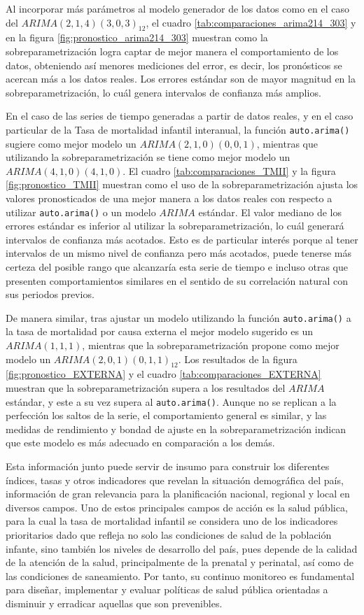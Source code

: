 \documentclass[
]{article}
\begin{document}
Al incorporar más parámetros al modelo generador de los datos como en el
caso del \(ARIMA(2,1,4)(3,0,3)_{12}\), el cuadro
\ref{tab:comparaciones_arima214_303} y en la figura
\ref{fig:pronostico_arima214_303} muestran como la sobreparametrización
logra captar de mejor manera el comportamiento de los datos, obteniendo
así menores mediciones del error, es decir, los pronósticos se acercan
más a los datos reales. Los errores estándar son de mayor magnitud en la
sobreparametrización, lo cuál genera intervalos de confianza más
amplios.

En el caso de las series de tiempo generadas a partir de datos reales, y
en el caso particular de la Tasa de mortalidad infantil interanual, la
función \texttt{auto.arima()} sugiere como mejor modelo un
\(ARIMA(2,1,0)(0,0,1)\), mientras que utilizando la sobreparametrización
se tiene como mejor modelo un \(ARIMA(4,1,0)(4,1,0)\). El cuadro
\ref{tab:comparaciones_TMII} y la figura \ref{fig:pronostico_TMII}
muestran como el uso de la sobreparametrización ajusta los valores
pronosticados de una mejor manera a los datos reales con respecto a
utilizar \texttt{auto.arima()} o un modelo \(ARIMA\) estándar. El valor
mediano de los errores estándar es inferior al utilizar la
sobreparametrización, lo cuál generará intervalos de confianza más
acotados. Esto es de particular interés porque al tener intervalos de un
mismo nivel de confianza pero más acotados, puede tenerse más certeza
del posible rango que alcanzaría esta serie de tiempo e incluso otras
que presenten comportamientos similares en el sentido de su correlación
natural con sus periodos previos.

De manera similar, tras ajustar un modelo utilizando la función
\texttt{auto.arima()} a la tasa de mortalidad por causa externa el mejor
modelo sugerido es un \(ARIMA(1,1,1)\), mientras que la
sobreparametrización propone como mejor modelo un
\(ARIMA(2,0,1)(0,1,1)_{12}\). Los resultados de la figura
\ref{fig:pronostico_EXTERNA} y el cuadro \ref{tab:comparaciones_EXTERNA}
muestran que la sobreparametrización supera a los resultados del
\(ARIMA\) estándar, y este a su vez supera al \texttt{auto.arima()}.
Aunque no se replican a la perfección los saltos de la serie, el
comportamiento general es similar, y las medidas de rendimiento y bondad
de ajuste en la sobreparametrización indican que este modelo es más
adecuado en comparación a los demás.

Esta información junto puede servir de insumo para construir los
diferentes índices, tasas y otros indicadores que revelan la situación
demográfica del país, información de gran relevancia para la
planificación nacional, regional y local en diversos campos. Uno de
estos principales campos de acción es la salud pública, para la cual la
tasa de mortalidad infantil se considera uno de los indicadores
prioritarios dado que refleja no solo las condiciones de salud de la
población infante, sino también los niveles de desarrollo del país, pues
depende de la calidad de la atención de la salud, principalmente de la
prenatal y perinatal, así como de las condiciones de saneamiento. Por
tanto, su continuo monitoreo es fundamental para diseñar, implementar y
evaluar políticas de salud pública orientadas a disminuir y erradicar
aquellas que son prevenibles.
\end{document}
